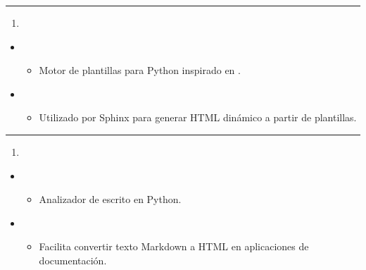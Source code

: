 \documentclass[a4paper,10pt,oneside,spanish,openany]{sphinxmanual}
\begin{document}
\bigskip\hrule\bigskip

\begin{enumerate}
%
\setcounter{enumi}{8}
\item {} 
\sphinxAtStartPar
{}

\end{enumerate}
\begin{itemize}
\item {} 
\sphinxAtStartPar
{}
\begin{itemize}
\item {} 
\sphinxAtStartPar
Motor de plantillas para Python inspirado en .

\end{itemize}

\item {} 
\sphinxAtStartPar
{}
\begin{itemize}
\item {} 
\sphinxAtStartPar
Utilizado por Sphinx para generar HTML dinámico a partir de plantillas.

\end{itemize}

\end{itemize}


\bigskip\hrule\bigskip

\begin{enumerate}
%
\setcounter{enumi}{9}
\item {} 
\sphinxAtStartPar
{}

\end{enumerate}
\begin{itemize}
\item {} 
\sphinxAtStartPar
{}
\begin{itemize}
\item {} 
\sphinxAtStartPar
Analizador de  escrito en Python.

\end{itemize}

\item {} 
\sphinxAtStartPar
{}
\begin{itemize}
\item {} 
\sphinxAtStartPar
Facilita convertir texto Markdown a HTML en aplicaciones de documentación.

\end{itemize}

\end{itemize}
\end{document}
